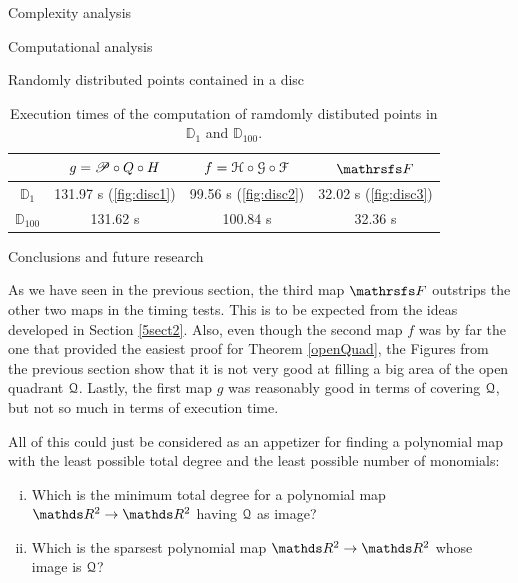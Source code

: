 \documentclass[11pt, a4paper, english, twoside, notitlepage, openright]{report}
\begin{document}
\begin{chapter}{Complexity analysis}
\begin{section}{Computational analysis}
\begin{subsection}{Randomly distributed points contained in a disc}
\vspace{0.2cm}

\begin{table}[ht!]
\begin{center}
\begin{tabular}{c || c | c | c}
& $g = \P\circ Q \circ H$ & $f=\HH\circ\GG\circ\FF$ & $\FFF$ \\ \hline \hline
${\mathbb D}_1$ & 131.97 s (\ref{fig:disc1}) & 99.56 s (\ref{fig:disc2}) & 32.02 s (\ref{fig:disc3}) \\ \hline
${\mathbb D}_{100}$ & 131.62 s & 100.84 s & 32.36 s \\
\end{tabular}
\caption[Execution times of the computation of points contained in ${\mathbb D}_{1}$ and ${\mathbb D}_{100}$.]{Execution times of the computation of ramdomly distibuted points in ${\mathbb D}_{1}$ and ${\mathbb D}_{100}$.}\label{tab:disc}
\end{center}
\end{table}

\end{subsection}

\end{section}

\begin{section}{Conclusions and future research}\label{5sect4}

As we have seen in the previous section, the third map $\FFF$ outstrips the other two maps in the timing tests. This is to be expected from the ideas developed in Section \ref{5sect2}. Also, even though the second map $f$ was by far the one that provided the easiest proof for Theorem \ref{openQuad}, the Figures from the previous section show that it is not very good at filling a big area of the open quadrant $\Qu$. Lastly, the first map $g$ was reasonably good in terms of covering $\Qu$, but not so much in terms of execution time.

All of this could just be considered as an appetizer for finding a polynomial map with the least possible total degree and the least possible number of monomials:
\begin{problem}
\begin{enumerate}[(i)]
\item Which is the minimum total degree for a polynomial map $\R^2 \to \R^2$ having $\Qu$ as image?
\item Which is the sparsest polynomial map $\R^2 \to \R^2$ whose image is $\Qu$?
\end{enumerate}
\end{problem}


\end{section}
\end{chapter}
\end{document}

